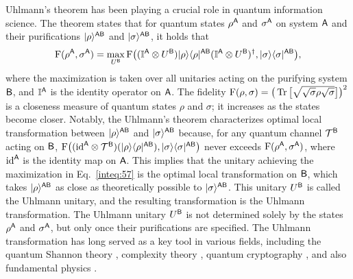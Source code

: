 






Uhlmann's theorem \cite{uhlmann1976transition} has been playing a crucial role in quantum information
science. The theorem states that for quantum states $\rho^{\mathsf{A}}$ and $\sigma^{\mathsf{A}}$ on system ${\mathsf{A}}$ and their purifications $|\rho\rangle^{{\mathsf{A}}{\mathsf{B}}}$ and $|\sigma\rangle^{{\mathsf{A}}{\mathsf{B}}}$, it holds that 
\begin{align}
\label{inteq:57}
    {\mathrm{F}}(\rho^{\mathsf{A}}, \sigma^{\mathsf{A}}) = \max_{U^{\mathsf{B}}}{\mathrm{F}}\big((\mathbb{I}^{\mathsf{A}} \otimes U^{\mathsf{B}}) |\rho\rangle\langle\rho|^{{\mathsf{A}}{\mathsf{B}}}(\mathbb{I}^{\mathsf{A}} \otimes U^{\mathsf{B}})^\dag, |\sigma\rangle\langle\sigma|^{{\mathsf{A}}{\mathsf{B}}}\big),
\end{align}
where the maximization is taken over all unitaries acting on the purifying system ${\mathsf{B}}$, and $\mathbb{I}^{\mathsf{A}}$ is the identity operator on ${\mathsf{A}}$.
The fidelity ${\mathrm{F}}(\rho, \sigma) = \big(\operatorname{Tr}\big[\sqrt{\sqrt{\sigma}\rho\sqrt{\sigma}}\big]\big)^2$ is a closeness measure of quantum states $\rho$ and $\sigma$; it increases as the states become closer. 
Notably, the Uhlmann's theorem characterizes optimal local transformation between $|\rho\rangle^{{\mathsf{A}}{\mathsf{B}}}$ and $|\sigma\rangle^{{\mathsf{A}}{\mathsf{B}}}$ because, for any quantum channel ${\mathcal{T}}^{\mathsf{B}}$ acting on ${\mathsf{B}}$, ${\mathrm{F}}\big(({\mathrm{id}}^{\mathsf{A}} \otimes {\mathcal{T}}^{\mathsf{B}})(|\rho\rangle\langle\rho|^{{\mathsf{A}}{\mathsf{B}}}), |\sigma\rangle\langle\sigma|^{{\mathsf{A}}{\mathsf{B}}}\big)$ never exceeds ${\mathrm{F}}(\rho^{\mathsf{A}}, \sigma^{\mathsf{A}})$, where ${\mathrm{id}}^{\mathsf{A}}$ is the identity map on ${\mathsf{A}}$. 
This implies that the unitary achieving the maximization in Eq.~\eqref{inteq:57} is the optimal local transformation on ${\mathsf{B}}$, which takes $|\rho\rangle^{{\mathsf{A}}{\mathsf{B}}}$ as close as theoretically possible to $|\sigma\rangle^{{\mathsf{A}}{\mathsf{B}}}$. 
This unitary $U^{\mathsf{B}}$ is called the Uhlmann unitary, and the resulting transformation is the Uhlmann transformation. The Uhlmann unitary $U^{\mathsf{B}}$ is not determined solely by the states $\rho^{\mathsf{A}}$ and $\sigma^{\mathsf{A}}$, but only once their purifications are specified.
The Uhlmann transformation has long served as a key tool in various fields, including the quantum Shannon theory \cite{devetak2005distillation, Abeyesinghe2009Motherfamilytree, Datta2011apexfamilytree, Datta2013OneShotCompression, bennett2014quantum, Wilde2017ConvrersePrivate, Metger2024entropyaccumulation, mazzola2025uhlmannstheoremrelativeentropies, fang2025variexpressuhlmann}, complexity theory \cite{kitaev2000parallelamplif, arnonfriedman2023computationalentanglementtheory, metger2023stateqipspace, bostanci2023unicompuhlmann, chia2024complexitytheoryquantumpromise, poremba2024LearningStabilizer}, quantum cryptography \cite{Mayer1997unconditionallysecure, Lo1998WhyBitCommit, Yan2022BitCommit, Khurana2024commitment}, and also fundamental physics \cite{hayden2007black, harlow2013CompvsFirewall, aaronson2016moneyblackhole, Kirklin2020holographicdual, Kirklin2022islandUhlmannphase, brakerski2023blackholeradiation}.


